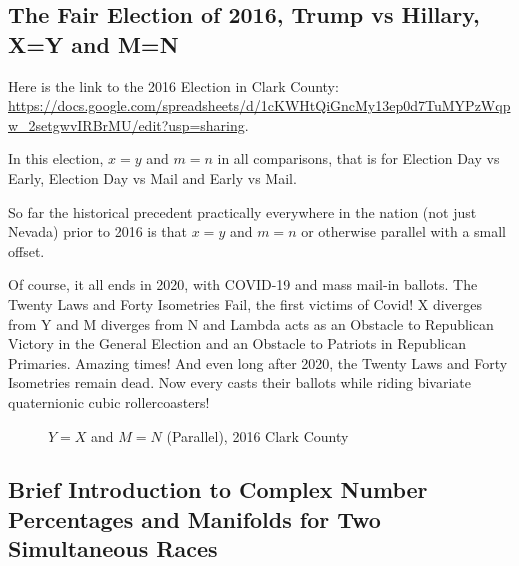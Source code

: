 \subsection{The Fair Election of 2016, Trump vs Hillary, X=Y and M=N}

Here is the link to the 2016 Election in Clark County: \url{https://docs.google.com/spreadsheets/d/1cKWHtQiGncMy13ep0d7TuMYPzWqpw_2setgwvIRBrMU/edit?usp=sharing}.

In this election, $x=y$ and $m=n$ in all comparisons, that is for Election Day vs Early, Election Day vs Mail and Early vs Mail.

So far the historical precedent practically everywhere in the nation (not just Nevada) prior to 2016 is that $x=y$ and $m=n$ or otherwise parallel with a small offset.

Of course, it all ends in 2020, with COVID-19 and mass mail-in ballots. The Twenty Laws and Forty Isometries Fail, the first victims of Covid! X diverges from Y and M diverges from N and Lambda acts as an Obstacle to Republican Victory in the General Election and an Obstacle to Patriots in Republican Primaries. Amazing times! And even long after 2020, the Twenty Laws and Forty Isometries remain dead. Now every casts their ballots while riding bivariate quaternionic cubic rollercoasters!
\begin{figure}[bp!]
\begin{center}
\caption{$Y=X$ and $M=N$ (Parallel), 2016 Clark County}
\noindent{}
\end{center}
\end{figure}
\newpage
\subsection{Brief Introduction to Complex Number Percentages and Manifolds for Two Simultaneous Races}

